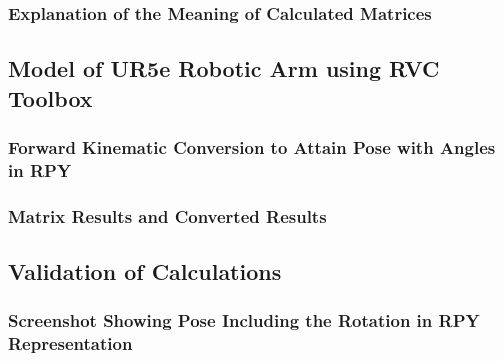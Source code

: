 \subsubsection{Explanation of the Meaning of Calculated Matrices}



\subsection{Model of UR5e Robotic Arm using RVC Toolbox}
\subsubsection{Forward Kinematic Conversion to Attain Pose with Angles in RPY}
\subsubsection{Matrix Results and Converted Results}
\subsection{Validation of Calculations}
\subsubsection{Screenshot Showing Pose Including the Rotation in RPY Representation}
